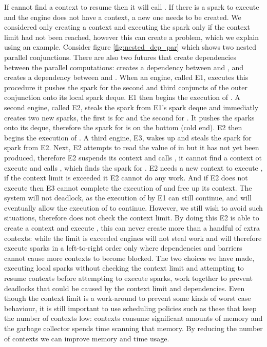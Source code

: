 If \idle cannot find a context to resume then it
will call \tryrunlocalspark.
If there is a spark to execute and the engine does not have a context,
a new one needs to be created.
We considered only creating a context and executing the spark only if the
context limit had not been reached,
however this can create a problem, which we explain using an example.
Consider figure \ref{fig:nested_dep_par} which shows two nested
parallel conjunctions.
There are also two futures that create dependencies between the parallel
computations:
 creates a dependency between  and ,
and  creates a dependency between  and .
When an engine, called E1,
executes this procedure it pushes the spark for the second and third
conjuncts of the outer conjunction onto its local spark deque.
E1 then begins the execution of .
A second engine, called E2,
steals the spark from E1's spark deque and immediatly creates two new
sparks, the first is for  and the second for .
It pushes the sparks onto its deque,
therefore the spark for  is on the bottom (cold end).
E2 then begins the execution of .
A third engine, E3,
wakes up and steals the spark for  spark from E2.
Next,
E2 attempts to read the value of  in  but it has not yet
been produced,
therefore E2 suspends its context and calls \idle, it cannot find a context
ot execute and calls \tryrunlocalspark,
which finds the spark for .
E2 needs a new context to execute , if the context limit is exceeded
it E2 cannot do any work.
And if E2 does not execute  then E3 cannot complete the execution of
 and free up its context.
The system will not deadlock, as the execution of  by E1 can still
continue, and will eventually allow the execution of  to continue.
However, we still wish to avoid such situations,
therefore \tryrunlocalspark does not check the context limit.
By doing this E2 is able to create a context and execute ,
this can never create more than a handful of extra contexts:
while the limit is exceeded engines will not steal work and will therefore
execute sparks in a left-to-right order only where dependencies and barriers
cannot cause more contexts to become blocked.
The two choices we have made,
executing local sparks without checking the context limit and
attempting to resume contexts before attempting to execute sparks,
work together to prevent deadlocks that could be caused by
the context limit and dependencies.
Even though the context limit is a work-around to prevent some kinds of
worst case behaviour,
it is still important to use scheduling policies such as these that keep the
number of contexts low:
contexts consume significant amounts of memory and
the garbage collector spends time scanning that memory.
By reducing the number of contexts we can improve memory and time usage.


